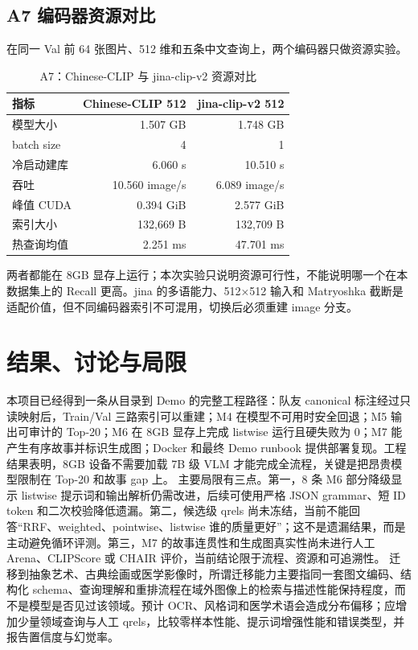 \documentclass[UTF8,11pt,a4paper]{ctexart}
\begin{document}
\subsection{A7 编码器资源对比}
在同一 Val 前 64 张图片、512 维和五条中文查询上，两个编码器只做资源实验。\begin{table}[H]\centering\small\caption{A7：Chinese-CLIP 与 jina-clip-v2 资源对比}\begin{tabular}{l r r}\toprule 指标 & Chinese-CLIP 512 & jina-clip-v2 512\\\midrule 模型大小 & 1.507 GB & 1.748 GB\\batch size & 4 & 1\\冷启动建库 & 6.060 s & 10.510 s\\吞吐 & 10.560 image/s & 6.089 image/s\\峰值 CUDA & 0.394 GiB & 2.577 GiB\\索引大小 & 132,669 B & 132,709 B\\热查询均值 & 2.251 ms & 47.701 ms\\\bottomrule\end{tabular}\end{table}
两者都能在 8GB 显存上运行；本次实验只说明资源可行性，不能说明哪一个在本数据集上的 Recall 更高。jina 的多语能力、512×512 输入和 Matryoshka 截断是适配价值，但不同编码器索引不可混用，切换后必须重建 image 分支。
\section{结果、讨论与局限}
本项目已经得到一条从目录到 Demo 的完整工程路径：队友 canonical 标注经过只读映射后，Train/Val 三路索引可以重建；M4 在模型不可用时安全回退；M5 输出可审计的 Top-20；M6 在 8GB 显存上完成 listwise 运行且硬失败为 0；M7 能产生有序故事并标识生成图；Docker 和最终 Demo runbook 提供部署复现。工程结果表明，8GB 设备不需要加载 7B 级 VLM 才能完成全流程，关键是把昂贵模型限制在 Top-20 和故事 gap 上。
主要局限有三点。第一，8 条 M6 部分降级显示 listwise 提示词和输出解析仍需改进，后续可使用严格 JSON grammar、短 ID token 和二次校验降低遗漏。第二，候选级 qrels 尚未冻结，当前不能回答“RRF、weighted、pointwise、listwise 谁的质量更好”；这不是遗漏结果，而是主动避免循环评测。第三，M7 的故事连贯性和生成图真实性尚未进行人工 Arena、CLIPScore 或 CHAIR 评价，当前结论限于流程、资源和可追溯性。
迁移到抽象艺术、古典绘画或医学影像时，所谓迁移能力主要指同一套图文编码、结构化 schema、查询理解和重排流程在域外图像上的检索与描述性能保持程度，而不是模型是否见过该领域。预计 OCR、风格词和医学术语会造成分布偏移；应增加少量领域查询与人工 qrels，比较零样本性能、提示词增强性能和错误类型，并报告置信度与幻觉率。
\end{document}
